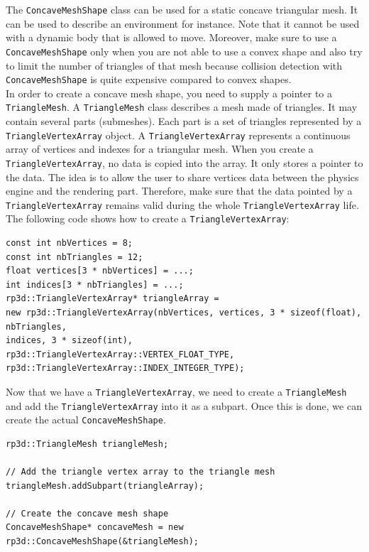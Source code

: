 \documentclass[a4paper,12pt]{article}
\begin{document}
  The \texttt{ConcaveMeshShape} class can be used for a static concave triangular mesh. It can be used to describe an environment for
  instance. Note that it cannot be used with a dynamic body that is allowed to move. Moreover, make sure to use a \texttt{ConcaveMeshShape} only
  when you are not able to use a convex shape and also try to limit the number of triangles of that mesh because collision detection
  with \texttt{ConcaveMeshShape} is quite expensive compared to convex shapes. \\

  In order to create a concave mesh shape, you need to supply a pointer to a \texttt{TriangleMesh}. A \texttt{TriangleMesh} class
  describes a mesh made of triangles. It may contain several parts (submeshes). Each part is a set of
  triangles represented by a \texttt{TriangleVertexArray} object. A \texttt{TriangleVertexArray} represents
  a continuous array of vertices and indexes for a triangular mesh. When you create a \texttt{TriangleVertexArray}, no data is copied
  into the array. It only stores a pointer to the data. The idea is to allow the user to share vertices data between the physics engine and the rendering
  part. Therefore, make sure that the data pointed by a \texttt{TriangleVertexArray} remains valid during the whole \texttt{TriangleVertexArray} life.
  \\

  The following code shows how to create a \texttt{TriangleVertexArray}: \\

  \begin{lstlisting}
const int nbVertices = 8;
const int nbTriangles = 12;
float vertices[3 * nbVertices] = ...;
int indices[3 * nbTriangles] = ...;
rp3d::TriangleVertexArray* triangleArray =
new rp3d::TriangleVertexArray(nbVertices, vertices, 3 * sizeof(float), nbTriangles,
indices, 3 * sizeof(int),
rp3d::TriangleVertexArray::VERTEX_FLOAT_TYPE,
rp3d::TriangleVertexArray::INDEX_INTEGER_TYPE);
  \end{lstlisting}

  \vspace{0.6cm}

  Now that we have a \texttt{TriangleVertexArray}, we need to create a \texttt{TriangleMesh} and add the \texttt{TriangleVertexArray}
  into it as a subpart. Once this is done, we can create the actual \texttt{ConcaveMeshShape}. \\

  \begin{lstlisting}
rp3d::TriangleMesh triangleMesh;

// Add the triangle vertex array to the triangle mesh
triangleMesh.addSubpart(triangleArray);

// Create the concave mesh shape
ConcaveMeshShape* concaveMesh = new rp3d::ConcaveMeshShape(&triangleMesh);
  \end{lstlisting}
\end{document}
